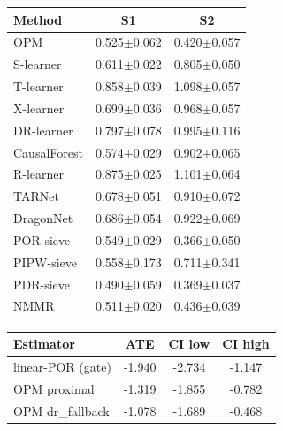 \begin{tabular}{lcc}
\hline
Method & S1 & S2 \\ \hline
OPM & 0.525$\pm$0.062 & 0.420$\pm$0.057 \\
S-learner & 0.611$\pm$0.022 & 0.805$\pm$0.050 \\
T-learner & 0.858$\pm$0.039 & 1.098$\pm$0.057 \\
X-learner & 0.699$\pm$0.036 & 0.968$\pm$0.057 \\
DR-learner & 0.797$\pm$0.078 & 0.995$\pm$0.116 \\
CausalForest & 0.574$\pm$0.029 & 0.902$\pm$0.065 \\
R-learner & 0.875$\pm$0.025 & 1.101$\pm$0.064 \\
TARNet & 0.678$\pm$0.051 & 0.910$\pm$0.072 \\
DragonNet & 0.686$\pm$0.054 & 0.922$\pm$0.069 \\
POR-sieve & 0.549$\pm$0.029 & 0.366$\pm$0.050 \\
PIPW-sieve & 0.558$\pm$0.173 & 0.711$\pm$0.341 \\
PDR-sieve & 0.490$\pm$0.059 & 0.369$\pm$0.037 \\
NMMR & 0.511$\pm$0.020 & 0.436$\pm$0.039 \\
\hline
\end{tabular}

\begin{tabular}{lccc}
\hline
Estimator & ATE & CI low & CI high \\ \hline
linear-POR (gate) & -1.940 & -2.734 & -1.147 \\
OPM proximal & -1.319 & -1.855 & -0.782 \\
OPM dr_fallback & -1.078 & -1.689 & -0.468 \\
\hline
\end{tabular}
